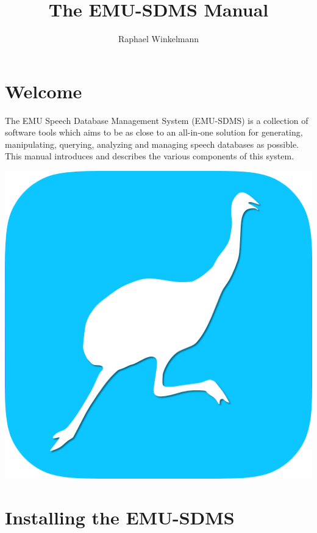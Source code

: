 \documentclass[]{book}
\title{The EMU-SDMS Manual}
\author{Raphael Winkelmann}
\date{}
\begin{document}
\maketitle

{
\setcounter{tocdepth}{1}
\tableofcontents
}
\hypertarget{welcome}{%
\chapter*{Welcome}\label{welcome}}

The EMU Speech Database Management System (EMU-SDMS) is a collection of software tools which aims to be as close to an all-in-one solution for generating, manipulating, querying, analyzing and managing speech databases as possible. This manual introduces and describes the various components of this system.

\begin{center}\includegraphics[width=0.35\linewidth]{pics/EMU-webAppIcon-roundCorners} \end{center}

\hypertarget{installing-the-emu-sdms}{%
\chapter{Installing the EMU-SDMS}\label{installing-the-emu-sdms}}
\end{document}
